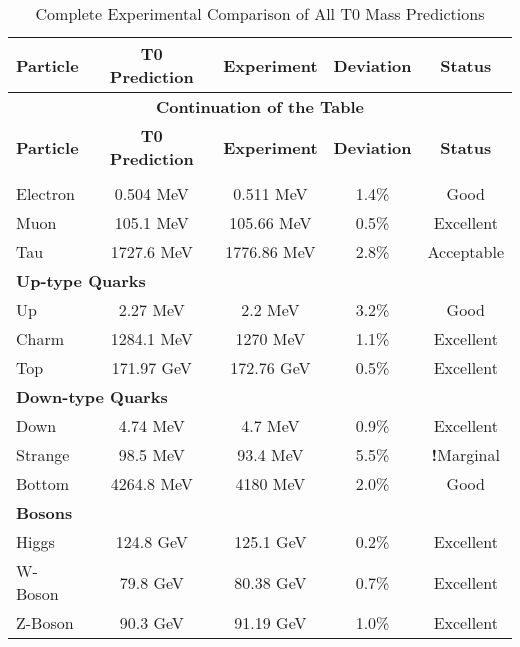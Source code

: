 \documentclass[12pt,a4paper]{article}
\newcommand{\checkmarkx}{\checkmark}
\newcommand{\warningx}{{\color{red}\textbf{!}}}
\begin{document}
	\begin{longtable}{lcccc}
		\caption{Complete Experimental Comparison of All T0 Mass Predictions} \\
		\toprule
		\textbf{Particle} & \textbf{T0 Prediction} & \textbf{Experiment} & \textbf{Deviation} & \textbf{Status} \\
		\midrule
		\endfirsthead
		
		\multicolumn{5}{c}{{\bfseries Continuation of the Table}} \\
		\toprule
		\textbf{Particle} & \textbf{T0 Prediction} & \textbf{Experiment} & \textbf{Deviation} & \textbf{Status} \\
		\midrule
		\endhead
		
		\bottomrule
		\endlastfoot
		
		\multicolumn{5}{l}{\textbf{Charged Leptons}} \\
		\midrule
		Electron & 0.504 MeV & 0.511 MeV & 1.4\% & \checkmarkx Good \\
		Muon & 105.1 MeV & 105.66 MeV & 0.5\% & \checkmarkx Excellent \\
		Tau & 1727.6 MeV & 1776.86 MeV & 2.8\% & \checkmarkx Acceptable \\
		\midrule
		\multicolumn{5}{l}{\textbf{Up-type Quarks}} \\
		\midrule
		Up & 2.27 MeV & 2.2 MeV & 3.2\% & \checkmarkx Good \\
		Charm & 1284.1 MeV & 1270 MeV & 1.1\% & \checkmarkx Excellent \\
		Top & 171.97 GeV & 172.76 GeV & 0.5\% & \checkmarkx Excellent \\
		\midrule
		\multicolumn{5}{l}{\textbf{Down-type Quarks}} \\
		\midrule
		Down & 4.74 MeV & 4.7 MeV & 0.9\% & \checkmarkx Excellent \\
		Strange & 98.5 MeV & 93.4 MeV & 5.5\% & \warningx Marginal \\
		Bottom & 4264.8 MeV & 4180 MeV & 2.0\% & \checkmarkx Good \\
		\midrule
		\multicolumn{5}{l}{\textbf{Bosons}} \\
		\midrule
		Higgs & 124.8 GeV & 125.1 GeV & 0.2\% & \checkmarkx Excellent \\
		W-Boson & 79.8 GeV & 80.38 GeV & 0.7\% & \checkmarkx Excellent \\
		Z-Boson & 90.3 GeV & 91.19 GeV & 1.0\% & \checkmarkx Excellent \\
		\bottomrule
	\end{longtable}
	
\end{document}
